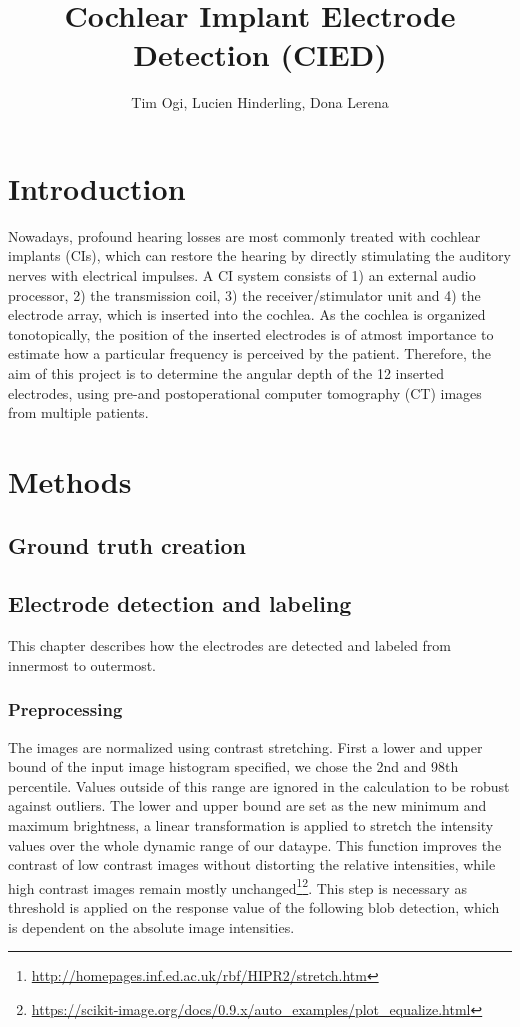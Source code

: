 \documentclass[a4paper, 11pt]{article}
\title{\textbf{Cochlear Implant Electrode Detection (CIED)}}
\author{Tim Ogi, Lucien Hinderling, Dona Lerena}
\begin{document}
\maketitle
\section{Introduction}
Nowadays, profound hearing losses are most commonly treated with cochlear implants (CIs), which can restore the hearing by directly stimulating the auditory nerves with electrical impulses. A CI system consists of 1) an external audio processor, 2) the transmission coil, 3) the receiver/stimulator unit and 4) the electrode array, which is inserted into the cochlea. As the cochlea is organized tonotopically, the position of the inserted electrodes is of atmost importance to estimate how a particular frequency is perceived by the patient. Therefore, the aim of this project is to determine the angular depth of the 12 inserted electrodes, using pre-and postoperational computer tomography (CT) images from multiple patients.


\section{Methods}
\subsection{Ground truth creation}
\subsection{Electrode detection and labeling}
This chapter describes how the electrodes are detected and labeled from innermost to outermost. 
\subsubsection{Preprocessing}
The images are normalized using contrast stretching. First a lower and upper bound of the input image histogram specified, we chose the 2nd and 98th percentile. Values outside of this range are ignored in the calculation to be robust against outliers. The lower and upper bound are set as the new minimum and maximum brightness, a linear transformation is applied to stretch the intensity values over the whole dynamic range of our dataype. This function improves the contrast of low contrast images without distorting the relative intensities, while high contrast images remain mostly unchanged\footnote{\url{http://homepages.inf.ed.ac.uk/rbf/HIPR2/stretch.htm}}\footnote{\url{https://scikit-image.org/docs/0.9.x/auto_examples/plot_equalize.html}}. This step is necessary as threshold is applied on the response value of the following blob detection, which is dependent on the absolute image intensities.
\end{document}
